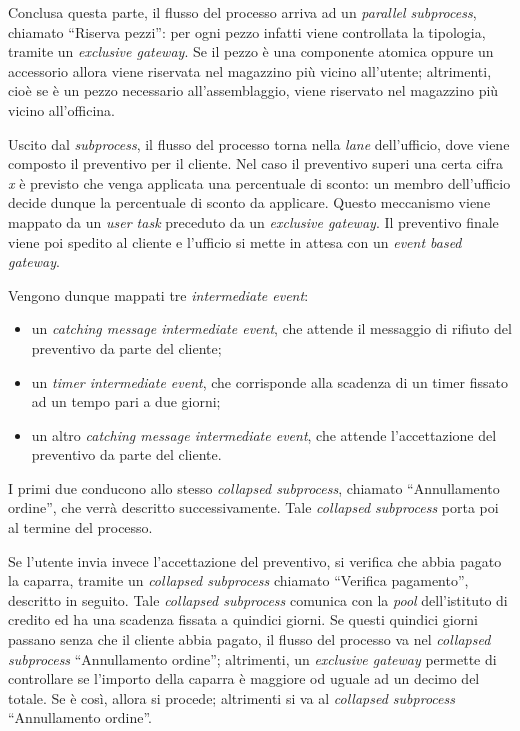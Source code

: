 Conclusa questa parte, il flusso del processo arriva ad un
\textit{parallel subprocess}, chiamato ``Riserva pezzi'': per ogni pezzo
infatti viene controllata la tipologia, tramite un
\textit{exclusive gateway}. Se il pezzo \`e una componente atomica
oppure un accessorio allora viene riservata nel magazzino pi\`u vicino
all'utente; altrimenti, cio\`e se \`e un pezzo necessario
all'assemblaggio, viene riservato nel magazzino pi\`u vicino
all'officina.

Uscito dal \textit{subprocess}, il flusso del processo torna nella
\textit{lane} dell'ufficio, dove viene composto il preventivo per il
cliente.
Nel caso il preventivo superi una certa cifra \textit{x} \`e previsto
che venga applicata una percentuale di sconto: un membro dell'ufficio
decide dunque la percentuale di sconto da applicare. Questo meccanismo
viene mappato da un \textit{user task} preceduto da un
\textit{exclusive gateway}. Il preventivo finale viene poi spedito al
cliente e l'ufficio si mette in attesa con un
\textit{event based gateway}.

Vengono dunque mappati tre \textit{intermediate event}:
\begin{itemize}
  \item un \textit{catching message intermediate event}, che attende il
  messaggio di rifiuto del preventivo da parte del cliente;
  \item un \textit{timer intermediate event}, che corrisponde alla
  scadenza di un timer fissato ad un tempo pari a due giorni;
  \item un altro \textit{catching message intermediate event}, che
  attende l'accettazione del preventivo da parte del cliente.
\end{itemize}
I primi due conducono allo stesso \textit{collapsed subprocess},
chiamato ``Annullamento ordine'', che verr\`a descritto successivamente.
Tale \textit{collapsed subprocess} porta poi al termine del processo.

Se l'utente invia invece l'accettazione del preventivo, si verifica che
abbia pagato la caparra, tramite un \textit{collapsed subprocess}
chiamato ``Verifica pagamento'', descritto in seguito. Tale
\textit{collapsed subprocess} comunica con la \textit{pool}
dell'istituto di credito ed ha una scadenza fissata a quindici giorni.
Se questi quindici giorni passano senza che il cliente abbia pagato, il
flusso del processo va nel \textit{collapsed subprocess} ``Annullamento
ordine''; altrimenti, un \textit{exclusive gateway} permette di
controllare se l'importo della caparra \`e maggiore od uguale ad un
decimo del totale. Se \`e cos\`i, allora si procede; altrimenti si va
al \textit{collapsed subprocess} ``Annullamento ordine''.

